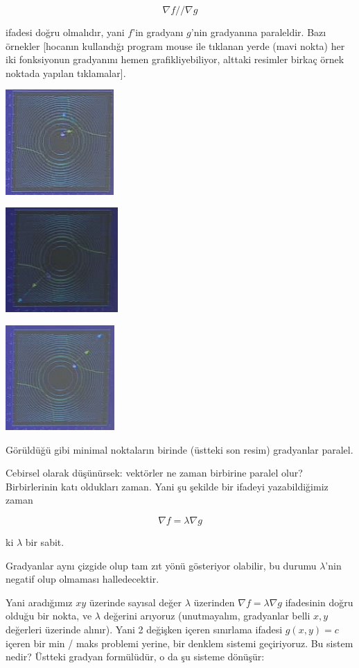 \documentclass[12pt,fleqn]{article}\usepackage{../../common}
\begin{document}
$$
\nabla f // \nabla g
$$

ifadesi doğru olmalıdır, yani $f$'in gradyanı $g$'nin gradyanına
paraleldir. Bazı örnekler [hocanın kullandığı program mouse ile tıklanan
yerde (mavi nokta) her iki fonksiyonun gradyanını hemen grafikliyebiliyor,
alttaki resimler birkaç örnek noktada yapılan tıklamalar]. 

\includegraphics[height=4cm]{13_4.png}

\includegraphics[height=4cm]{13_6.png}

\includegraphics[height=4cm]{13_5.png}

Görüldüğü gibi minimal noktaların birinde (üstteki son resim) gradyanlar
paralel. 

Cebirsel olarak düşünürsek: vektörler ne zaman birbirine paralel olur?
Birbirlerinin katı oldukları zaman. Yani şu şekilde bir ifadeyi
yazabildiğimiz zaman

$$
\nabla f = \lambda \nabla g
$$

ki $\lambda$ bir sabit. 

Gradyanlar aynı çizgide olup tam zıt yönü gösteriyor olabilir, bu durumu
$\lambda$'nin negatif olup olmaması halledecektir.

Yani aradığımız $xy$ üzerinde sayısal değer $\lambda$ üzerinden $\nabla f =
\lambda \nabla g$ ifadesinin doğru olduğu bir nokta, ve $\lambda$ değerini
arıyoruz (unutmayalım, gradyanlar belli $x,y$ değerleri üzerinde alınır). Yani 2
değişken içeren sınırlama ifadesi $g(x,y)=c$ içeren bir min / maks problemi
yerine, bir denklem sistemi geçiriyoruz. Bu sistem nedir?  Üstteki gradyan
formülüdür, o da şu sisteme dönüşür:
\end{document}
